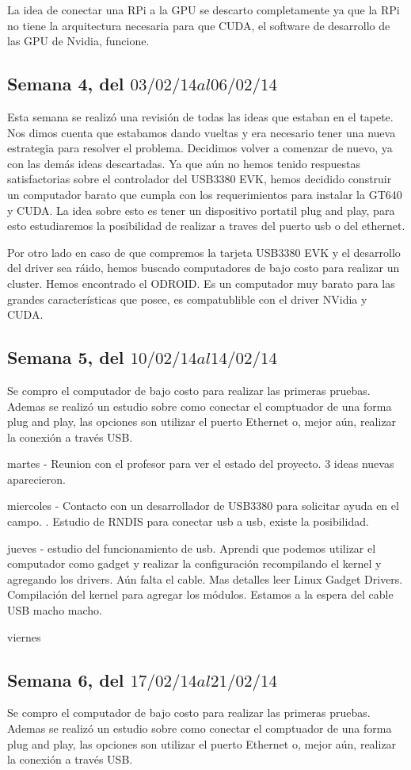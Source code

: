 \documentclass[11pt,oneside,titlepage]{article}
\begin{document}
La idea de conectar una RPi a la GPU se descarto completamente ya que la RPi no 
tiene la arquitectura necesaria para que CUDA, el software de desarrollo de las GPU de Nvidia, funcione.

\subsection*{Semana 4, del $03/02/14 al 06/02/14$}

Esta semana se realizó una revisión de todas las ideas que estaban en el
tapete. Nos dimos cuenta que estabamos dando vueltas y era necesario tener una
nueva estrategia para resolver el problema. Decidimos volver a comenzar de
nuevo, ya con las demás ideas descartadas. Ya que aún no hemos tenido
respuestas satisfactorias sobre el controlador del USB3380 EVK, hemos decidido
construir un computador barato que cumpla con los requerimientos para instalar
la GT640 y CUDA. La idea sobre esto es tener un dispositivo portatil plug and
play, para esto estudiaremos la posibilidad de realizar a traves del puerto usb
o del ethernet. 

Por otro lado en caso de que compremos la tarjeta USB3380 EVK y el desarrollo
del driver sea ráido, hemos buscado computadores de bajo costo para realizar un
cluster. Hemos encontrado el ODROID. Es un computador muy barato para las
grandes características que posee, es compatublible con el driver NVidia y
CUDA.

\subsection*{Semana 5, del $10/02/14 al 14/02/14$}

Se compro el computador de bajo costo para realizar las primeras pruebas.
Ademas se realizó un estudio sobre como conectar el comptuador de una forma plug
and play, las opciones son utilizar el puerto Ethernet o, mejor aún, realizar la
conexión a trav\'es USB.

martes - Reunion con el profesor para ver el estado del proyecto. 3 ideas nuevas aparecieron.

miercoles - Contacto con un desarrollador de USB3380 para solicitar ayuda en el campo. . Estudio de RNDIS para conectar usb a usb, existe la posibilidad.

jueves - estudio del funcionamiento de usb. Aprendi que podemos utilizar el computador 
como gadget y realizar la configuración recompilando el kernel y agregando los drivers.
Aún falta el cable. Mas detalles leer Linux Gadget Drivers. 
Compilación del kernel para agregar los módulos. Estamos a la espera del cable USB macho macho.

viernes
\subsection*{Semana 6, del $17/02/14 al 21/02/14$}

Se compro el computador de bajo costo para realizar las primeras pruebas.
Ademas se realizó un estudio sobre como conectar el comptuador de una forma plug
and play, las opciones son utilizar el puerto Ethernet o, mejor aún, realizar la
conexión a trav\'es USB.
\end{document}
